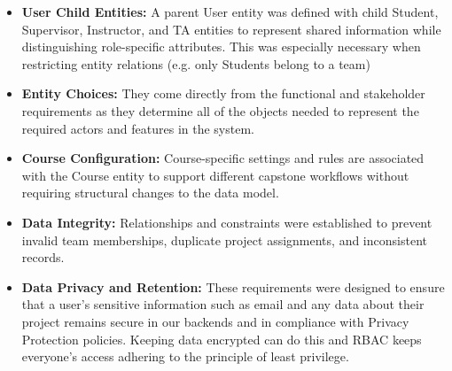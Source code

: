 \documentclass[12pt]{article}
\newcounter{tin}
\begin{document}
  \begin{itemize}
      \item \textbf{User Child Entities:} A parent User entity was defined with child Student, Supervisor, 
      Instructor, and TA entities to represent shared information while distinguishing role-specific attributes.
      This was especially necessary when restricting entity relations (e.g. only Students belong to a team)
      \item \textbf{Entity Choices:} They come directly from the functional and stakeholder requirements as they determine all 
      of the objects needed to represent the required actors and features in the system.
      \item \textbf{Course Configuration:} Course-specific settings and rules are associated with the Course entity to support 
      different capstone workflows without requiring structural changes to the data model.
      \item \textbf{Data Integrity:} Relationships and constraints were established to prevent invalid team memberships, 
      duplicate project assignments, and inconsistent records.
      \item \textbf{Data Privacy and Retention:} These requirements were designed to ensure that a user's sensitive information
      such as email and any data about their project remains secure in our backends and in compliance with Privacy Protection
      policies. Keeping data encrypted can do this and RBAC keeps everyone's access adhering to the principle of least privilege.
  \end{itemize}
\end{document}
